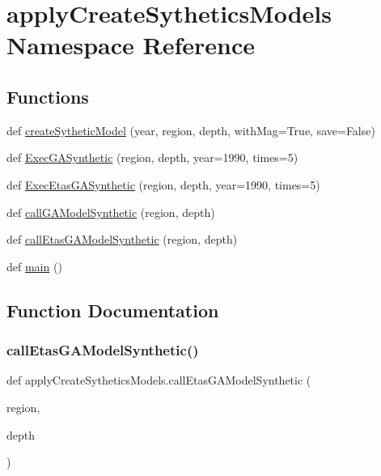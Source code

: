 \hypertarget{namespaceapply_create_sythetics_models}{}\section{apply\+Create\+Sythetics\+Models Namespace Reference}
\label{namespaceapply_create_sythetics_models}
\subsection*{Functions}
\begin{DoxyCompactItemize}
\item 
def \hyperlink{namespaceapply_create_sythetics_models_ace1f4f075e61240911c118fb5d1950e3}{create\+Sythetic\+Model} (year, region, depth, with\+Mag=True, save=False)
\item 
def \hyperlink{namespaceapply_create_sythetics_models_a6bf131fedd356ab73e3ab5068c2b4f2c}{Exec\+G\+A\+Synthetic} (region, depth, year=1990, times=5)
\item 
def \hyperlink{namespaceapply_create_sythetics_models_a1a1737fcb775e89cc32c84acc1c21136}{Exec\+Etas\+G\+A\+Synthetic} (region, depth, year=1990, times=5)
\item 
def \hyperlink{namespaceapply_create_sythetics_models_a2801683bfcf588f545592c33ed25e5a4}{call\+G\+A\+Model\+Synthetic} (region, depth)
\item 
def \hyperlink{namespaceapply_create_sythetics_models_a8acd1a0f978e5461154f581eb9240d69}{call\+Etas\+G\+A\+Model\+Synthetic} (region, depth)
\item 
def \hyperlink{namespaceapply_create_sythetics_models_ac331ebcf2141e14d7ecb9fc32ccf3e47}{main} ()
\end{DoxyCompactItemize}


\subsection{Function Documentation}
\mbox{\label{namespaceapply_create_sythetics_models_a8acd1a0f978e5461154f581eb9240d69}} 
\subsubsection{\texorpdfstring{call\+Etas\+G\+A\+Model\+Synthetic()}{callEtasGAModelSynthetic()}}
{\footnotesize\ttfamily def apply\+Create\+Sythetics\+Models.\+call\+Etas\+G\+A\+Model\+Synthetic (\begin{DoxyParamCaption}\item[{}]{region,  }\item[{}]{depth }\end{DoxyParamCaption})}


